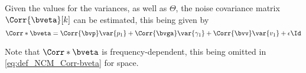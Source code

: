 
Given the values for the variances, as well as $\Theta$, the noise covariance matrix $\Corr{\bveta}[k]$ can be estimated, this being given by
\begin{equation}
	\label{eq:def_NCM_Corr-bveta}
	\Corr*{\bveta} = \Corr{\bvp} \var{p_1} + \Corr{\bvga} \var{\gamma_1} + \Corr{\bvv} \var{v_1} + \epsilon \Id
\end{equation}

Note that $\Corr*{\bveta}$ is frequency-dependent, this being omitted in \cref{eq:def_NCM_Corr-bveta} for space.
